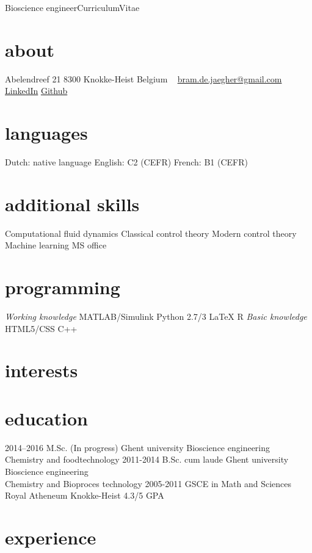 \documentclass[]{friggeri-cv}
\begin{document}
       {Bioscience engineer}{Curriculum}{Vitae}
\begin{aside}
  \section{about}
    Abelendreef 21
    8300 Knokke-Heist
    Belgium
    ~
    \href{mailto:bram.de.jaegher@gmail.com}{bram.de.jaegher@gmail.com}
    \href{http://be.linkedin.com/in/BramDeJaegher}{LinkedIn}
    \href{https://github.com/Beramos}{Github}
  \section{languages}
    Dutch: native language
    English: C2 (CEFR)
    French:  B1  (CEFR)
  \section{additional skills}
  Computational fluid dynamics
  Classical control theory 
  Modern control theory 
  Machine learning
  MS office
  \section{programming}
  \textit{Working knowledge}
  MATLAB/Simulink
  Python 2.7/3
  LaTeX
  R 
  \textit{Basic knowledge}
  HTML5/CSS
  C++
\end{aside}
\section{interests}
\section{education}
\begin{entrylist}
    \entry
    {2014–2016}
    {M.Sc. (In progress)}
    {Ghent university}
    {Bioscience engineering\\
    Chemistry and foodtechnology}
  \entry
    {2011-2014}
    {B.Sc. cum laude}
    {Ghent university}
    {Bioscience engineering\\
    Chemistry and Bioproces technology}
  \entry
    {2005-2011}
    {GSCE in Math and Sciences}
    {Royal Atheneum Knokke-Heist}
    {4.3/5 GPA}
   
\end{entrylist}
\section{experience}
\end{document}
